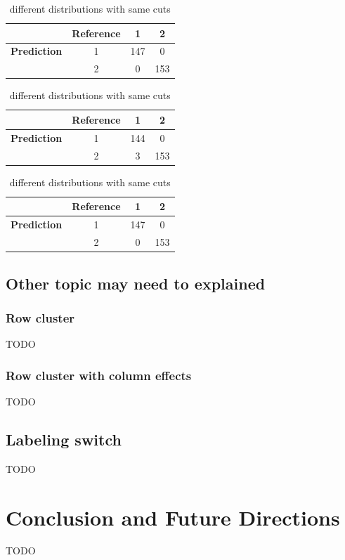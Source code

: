 \documentclass{article}
\begin{document}
\begin{table}[h]
  \centering

  \caption*{\textbf{Confusion matrix of Normal Distributions}}

  \begin{minipage}{0.45\textwidth}
    \centering
    \begin{tabular}{c|c|c|c}
              & \textbf{Reference} & 1 & 2 \\
    \hline
    \textbf{Prediction} & 1 & 147 & 0 \\
                        & 2 & 0 & 153 \\
    \end{tabular}
    \caption{Far center}
    \label{tab:nor_far}
  \end{minipage}
  \hfill
  \begin{minipage}{0.45\textwidth}
    \centering
    \begin{tabular}{c|c|c|c}
              & \textbf{Reference} & 1 & 2 \\
    \hline
    \textbf{Prediction} & 1 & 144 & 0 \\
                        & 2 & 3 & 153 \\
    \end{tabular}
    \caption{Close center}
    \label{tab:nor_close}
  \end{minipage}

  \vspace{1em} %

  \begin{minipage}{0.45\textwidth}
    \centering
    \begin{tabular}{c|c|c|c}
              & \textbf{Reference} & 1 & 2 \\
    \hline
    \textbf{Prediction} & 1 & 147 & 0 \\
                        & 2 & 0 & 153 \\
    \end{tabular}
    \caption{different distributions with same cuts}
    \label{tab:nor_cuts}
  \end{minipage}
\end{table}

\subsection{Other topic may need to explained}

\subsubsection{Row cluster}

TODO

\subsubsection{Row cluster with column effects}

TODO


\subsection{Labeling switch}

TODO

\section{Conclusion and Future Directions}

TODO

\printbibliography
\end{document}

